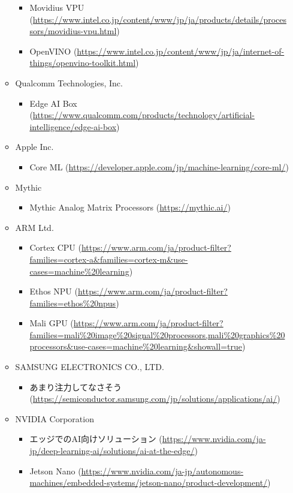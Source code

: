 \begin{itemize}
\begin{itemize}
\begin{itemize}
			\item Movidius VPU (\url{https://www.intel.co.jp/content/www/jp/ja/products/details/processors/movidius-vpu.html})
			\item OpenVINO (\url{https://www.intel.co.jp/content/www/jp/ja/internet-of-things/openvino-toolkit.html})
		\end{itemize}
		\item Qualcomm Technologies, Inc.
		\begin{itemize}
			\item Edge AI Box (\url{https://www.qualcomm.com/products/technology/artificial-intelligence/edge-ai-box})
		\end{itemize}
		\item Apple Inc.
		\begin{itemize}
			\item Core ML (\url{https://developer.apple.com/jp/machine-learning/core-ml/})
		\end{itemize}
		\item Mythic
		\begin{itemize}
			\item Mythic Analog Matrix Processors (\url{https://mythic.ai/})
		\end{itemize}
		\item ARM Ltd.
		\begin{itemize}
			\item Cortex CPU (\url{https://www.arm.com/ja/product-filter?families=cortex-a&families=cortex-m&use-cases=machine%20learning})
			\item Ethos NPU (\url{https://www.arm.com/ja/product-filter?families=ethos%20npus})
			\item Mali GPU (\url{https://www.arm.com/ja/product-filter?families=mali%20image%20signal%20processors,mali%20graphics%20processors&use-cases=machine%20learning&showall=true})
		\end{itemize}
		\item SAMSUNG ELECTRONICS CO., LTD.
		\begin{itemize}
			\item あまり注力してなさそう (\url{https://semiconductor.samsung.com/jp/solutions/applications/ai/})
		\end{itemize}
		\item NVIDIA Corporation
		\begin{itemize}
			\item エッジでのAI向けソリューション (\url{https://www.nvidia.com/ja-jp/deep-learning-ai/solutions/ai-at-the-edge/})
			\item Jetson Nano (\url{https://www.nvidia.com/ja-jp/autonomous-machines/embedded-systems/jetson-nano/product-development/})

\end{itemize}
\end{itemize}
\end{itemize}
